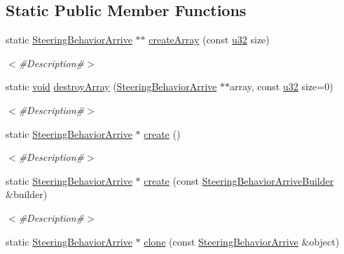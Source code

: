 \subsection*{Static Public Member Functions}
\begin{DoxyCompactItemize}
\item 
static \mbox{\hyperlink{classnjli_1_1_steering_behavior_arrive}{Steering\+Behavior\+Arrive}} $\ast$$\ast$ \mbox{\hyperlink{classnjli_1_1_steering_behavior_arrive_a2c5ab81118b43b5cd6c5b1f0c0820730}{create\+Array}} (const \mbox{\hyperlink{_util_8h_a10e94b422ef0c20dcdec20d31a1f5049}{u32}} size)
\begin{DoxyCompactList}\small\item\em $<$\#\+Description\#$>$ \end{DoxyCompactList}\item 
static \mbox{\hyperlink{_thread_8h_af1e856da2e658414cb2456cb6f7ebc66}{void}} \mbox{\hyperlink{classnjli_1_1_steering_behavior_arrive_ad5836ab023df75e4accd4700f4e7a4bc}{destroy\+Array}} (\mbox{\hyperlink{classnjli_1_1_steering_behavior_arrive}{Steering\+Behavior\+Arrive}} $\ast$$\ast$array, const \mbox{\hyperlink{_util_8h_a10e94b422ef0c20dcdec20d31a1f5049}{u32}} size=0)
\begin{DoxyCompactList}\small\item\em $<$\#\+Description\#$>$ \end{DoxyCompactList}\item 
static \mbox{\hyperlink{classnjli_1_1_steering_behavior_arrive}{Steering\+Behavior\+Arrive}} $\ast$ \mbox{\hyperlink{classnjli_1_1_steering_behavior_arrive_ab5cf89afc4d132c4558e4959c29eea7c}{create}} ()
\begin{DoxyCompactList}\small\item\em $<$\#\+Description\#$>$ \end{DoxyCompactList}\item 
static \mbox{\hyperlink{classnjli_1_1_steering_behavior_arrive}{Steering\+Behavior\+Arrive}} $\ast$ \mbox{\hyperlink{classnjli_1_1_steering_behavior_arrive_ae0682be1bc15506a432297ba991cba4e}{create}} (const \mbox{\hyperlink{classnjli_1_1_steering_behavior_arrive_builder}{Steering\+Behavior\+Arrive\+Builder}} \&builder)
\begin{DoxyCompactList}\small\item\em $<$\#\+Description\#$>$ \end{DoxyCompactList}\item 
static \mbox{\hyperlink{classnjli_1_1_steering_behavior_arrive}{Steering\+Behavior\+Arrive}} $\ast$ \mbox{\hyperlink{classnjli_1_1_steering_behavior_arrive_aa53741674c97533bb49a16089cd824c9}{clone}} (const \mbox{\hyperlink{classnjli_1_1_steering_behavior_arrive}{Steering\+Behavior\+Arrive}} \&object)

\end{DoxyCompactItemize}
